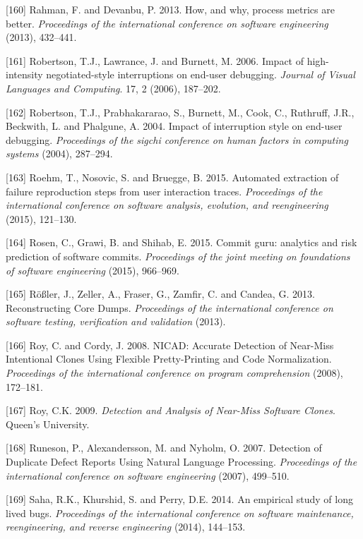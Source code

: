 \documentclass[12pt]{report}
\begin{document}
\hypertarget{ref-rahman2013}{}
{[}160{]} Rahman, F. and Devanbu, P. 2013. How, and why, process metrics
are better. \emph{Proceedings of the international conference on
software engineering} (2013), 432--441.

\hypertarget{ref-Robertson2006}{}
{[}161{]} Robertson, T.J., Lawrance, J. and Burnett, M. 2006. Impact of
high-intensity negotiated-style interruptions on end-user debugging.
\emph{Journal of Visual Languages and Computing}. 17, 2 (2006),
187--202.

\hypertarget{ref-Robertson2004}{}
{[}162{]} Robertson, T.J., Prabhakararao, S., Burnett, M., Cook, C.,
Ruthruff, J.R., Beckwith, L. and Phalgune, A. 2004. Impact of
interruption style on end-user debugging. \emph{Proceedings of the
sigchi conference on human factors in computing systems} (2004),
287--294.

\hypertarget{ref-Roehm2015}{}
{[}163{]} Roehm, T., Nosovic, S. and Bruegge, B. 2015. Automated
extraction of failure reproduction steps from user interaction traces.
\emph{Proceedings of the international conference on software analysis,
evolution, and reengineering} (2015), 121--130.

\hypertarget{ref-Rosen2015}{}
{[}164{]} Rosen, C., Grawi, B. and Shihab, E. 2015. Commit guru:
analytics and risk prediction of software commits. \emph{Proceedings of
the joint meeting on foundations of software engineering} (2015),
966--969.

\hypertarget{ref-Rossler2013}{}
{[}165{]} Rößler, J., Zeller, A., Fraser, G., Zamfir, C. and Candea, G.
2013. Reconstructing Core Dumps. \emph{Proceedings of the international
conference on software testing, verification and validation} (2013).

\hypertarget{ref-Roy2008}{}
{[}166{]} Roy, C. and Cordy, J. 2008. NICAD: Accurate Detection of
Near-Miss Intentional Clones Using Flexible Pretty-Printing and Code
Normalization. \emph{Proceedings of the international conference on
program comprehension} (2008), 172--181.

\hypertarget{ref-Iss2009}{}
{[}167{]} Roy, C.K. 2009. \emph{Detection and Analysis of Near-Miss
Software Clones}. Queen's University.

\hypertarget{ref-Runeson2007}{}
{[}168{]} Runeson, P., Alexandersson, M. and Nyholm, O. 2007. Detection
of Duplicate Defect Reports Using Natural Language Processing.
\emph{Proceedings of the international conference on software
engineering} (2007), 499--510.

\hypertarget{ref-Saha2014}{}
{[}169{]} Saha, R.K., Khurshid, S. and Perry, D.E. 2014. An empirical
study of long lived bugs. \emph{Proceedings of the international
conference on software maintenance, reengineering, and reverse
engineering} (2014), 144--153.
\end{document}
